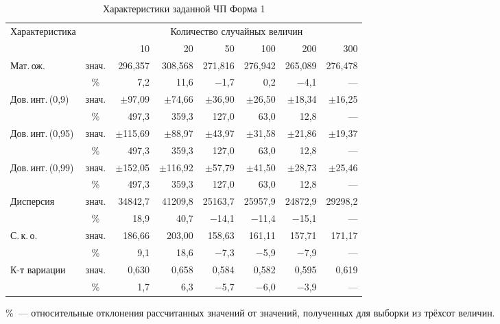 \documentclass[a4paper,12pt]{article}
\begin{document}
\begin{table}[H]
\caption{Характеристики заданной ЧП \hfill Форма 1}\label{tab:f1}
\centering\small
\begin{tabular}{|l|c|r|r|r|r|r|r|}
\hline
\multirow{2}{*}{Характеристика} & & \multicolumn{6}{c|}{Количество случайных величин} \\ \cline{3-8}
 & & 10 & 20 & 50 & 100 & 200 & 300 \\ \hline
\multirow{2}{*}{Мат.\,ож.} & знач. & 296{,}357 & 308{,}568 & 271{,}816 & 276{,}942 & 265{,}089 & 276{,}478 \\
 & \% & 7{,}2 & 11{,}6 & \ensuremath{-}1{,}7 & 0{,}2 & \ensuremath{-}4{,}1 & --- \\ \hline
\multirow{2}{*}{Дов.\,инт.\,(0,9)} & знач. & $\pm$97{,}09 & $\pm$74{,}66 & $\pm$36{,}90 & $\pm$26{,}50 & $\pm$18{,}34 & $\pm$16{,}25 \\
 & \% & 497{,}3 & 359{,}3 & 127{,}0 & 63{,}0 & 12{,}8 & --- \\ \hline
\multirow{2}{*}{Дов.\,инт.\,(0,95)} & знач. & $\pm$115{,}69 & $\pm$88{,}97 & $\pm$43{,}97 & $\pm$31{,}58 & $\pm$21{,}86 & $\pm$19{,}37 \\
 & \% & 497{,}3 & 359{,}3 & 127{,}0 & 63{,}0 & 12{,}8 & --- \\ \hline
\multirow{2}{*}{Дов.\,инт.\,(0,99)} & знач. & $\pm$152{,}05 & $\pm$116{,}92 & $\pm$57{,}79 & $\pm$41{,}50 & $\pm$28{,}73 & $\pm$25{,}46 \\
 & \% & 497{,}3 & 359{,}3 & 127{,}0 & 63{,}0 & 12{,}8 & --- \\ \hline
\multirow{2}{*}{Дисперсия} & знач. & 34842{,}7 & 41209{,}8 & 25163{,}7 & 25957{,}9 & 24872{,}9 & 29298{,}2 \\
 & \% & 18{,}9 & 40{,}7 & \ensuremath{-}14{,}1 & \ensuremath{-}11{,}4 & \ensuremath{-}15{,}1 & --- \\ \hline
\multirow{2}{*}{С.\,к.\,о.} & знач. & 186{,}66 & 203{,}00 & 158{,}63 & 161{,}11 & 157{,}71 & 171{,}17 \\
 & \% & 9{,}1 & 18{,}6 & \ensuremath{-}7{,}3 & \ensuremath{-}5{,}9 & \ensuremath{-}7{,}9 & --- \\ \hline
\multirow{2}{*}{К-т вариации} & знач. & 0{,}630 & 0{,}658 & 0{,}584 & 0{,}582 & 0{,}595 & 0{,}619 \\
 & \% & 1{,}7 & 6{,}3 & \ensuremath{-}5{,}7 & \ensuremath{-}6{,}0 & \ensuremath{-}3{,}9 & --- \\ \hline
\end{tabular}

\smallskip
\footnotesize \%~--- относительные отклонения рассчитанных значений от значений, полученных для выборки из трёхсот величин.
\end{table}
\end{document}
